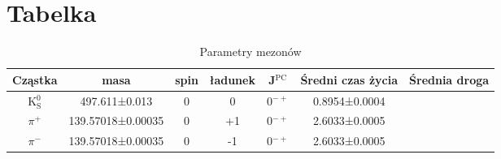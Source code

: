 \section{Tabelka}

\begin{table}[H]
\centering
\caption{Parametry mezonów}
\begin{tabular}{ccccccc}
Cząstka		&masa			&spin	&ładunek	&J$^\text{PC}$	&Średni czas życia	&Średnia droga 	\\ \hline
K$^0_\text{S}$	&497.611±0.013		&0	&0		&0$^{-+}$	&0.8954±0.0004		&		\\
$\pi$$^+$	&139.57018±0.00035	&0	&+1		&0$^{-+}$	&2.6033±0.0005		&		\\
$\pi$$^-$	&139.57018±0.00035	&0	&-1		&0$^{-+}$	&2.6033±0.0005		&		\\
\end{tabular}
\end{table}

